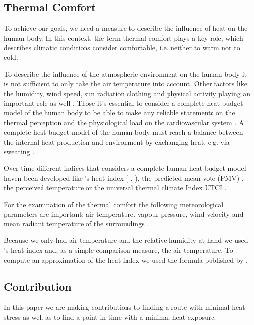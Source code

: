 \subsection{Thermal Comfort}

To achieve our goals, we need a measure to describe the influence of heat on the human body.  In this context, the term thermal comfort plays a key role, which describes climatic conditions consider comfortable, i.e. neither to warm nor to cold.

To describe the influence of the atmospheric environment on the human body it is not sufficient to only take the air temperature into account. Other factors like the humidity, wind speed, sun radiation clothing and physical activity playing an important role as well \parencite{Staiger2011,Huebler2007}.  Those it's essential to consider a complete heat budget model of the human body to be able to make any reliable statements on the thermal perception and the physiological load on the cardiovascular system \parencite{Staiger1997}. A complete heat budget model of the human body must reach a balance between the internal heat production and environment by exchanging heat, e.g. via sweating \parencite{Staiger2011}. 

Over time different indices that considers a complete human heat budget model haven been developed like \citeauthor{Steadman1979}'s heat index  (\citeauthor{Steadman1979} \citeyear*{Steadman1979}, \citeyear*{Steadman1979a}), the predicted mean vote (PMV) \parencite{Fanger1973}, the perceived temperature \parencite{Staiger1997,Jendritzky2000} or the universal thermal climate Index UTCI \parencite{Jendritzky2010}.

For the examination of the thermal comfort the following meteorological parameters are important: air temperature, vapour pressure,
wind velocity and mean radiant temperature of the surroundings \parencite{Matzarakis1999}.

Because we only had air temperature and the relative humidity at hand we used \citeauthor{Steadman1979}'s heat index \parencite{Steadman1979} and, as a simple comparison measure, the air temperature. To compute an approximation of the heat index we used the formula published by \textcite[77]{Stull2011}. 


\subsection{Contribution}

In this paper we are making contributions to finding a route with minimal heat stress as well as to find a point in time with a minimal heat exposure. 

